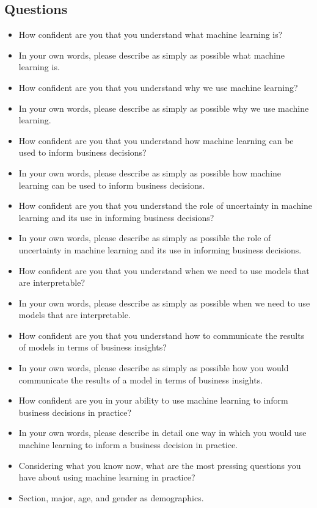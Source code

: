 \documentclass[
  12pt]{article}
\providecommand{\tightlist}{%
  \setlength{\itemsep}{0pt}\setlength{\parskip}{0pt}}
\begin{document}
\subsection{Questions}\label{questions}

\begin{itemize}
\tightlist
\item
  How confident are you that you understand what machine learning is?
\item
  In your own words, please describe as simply as possible what machine
  learning is.
\item
  How confident are you that you understand why we use machine learning?
\item
  In your own words, please describe as simply as possible why we use
  machine learning.
\item
  How confident are you that you understand how machine learning can be
  used to inform business decisions?
\item
  In your own words, please describe as simply as possible how machine
  learning can be used to inform business decisions.
\item
  How confident are you that you understand the role of uncertainty in
  machine learning and its use in informing business decisions?
\item
  In your own words, please describe as simply as possible the role of
  uncertainty in machine learning and its use in informing business
  decisions.
\item
  How confident are you that you understand when we need to use models
  that are interpretable?
\item
  In your own words, please describe as simply as possible when we need
  to use models that are interpretable.
\item
  How confident are you that you understand how to communicate the
  results of models in terms of business insights?
\item
  In your own words, please describe as simply as possible how you would
  communicate the results of a model in terms of business insights.
\item
  How confident are you in your ability to use machine learning to
  inform business decisions in practice?
\item
  In your own words, please describe in detail one way in which you
  would use machine learning to inform a business decision in practice.
\item
  Considering what you know now, what are the most pressing questions
  you have about using machine learning in practice?
\item
  Section, major, age, and gender as demographics.
\end{itemize}



\end{document}
